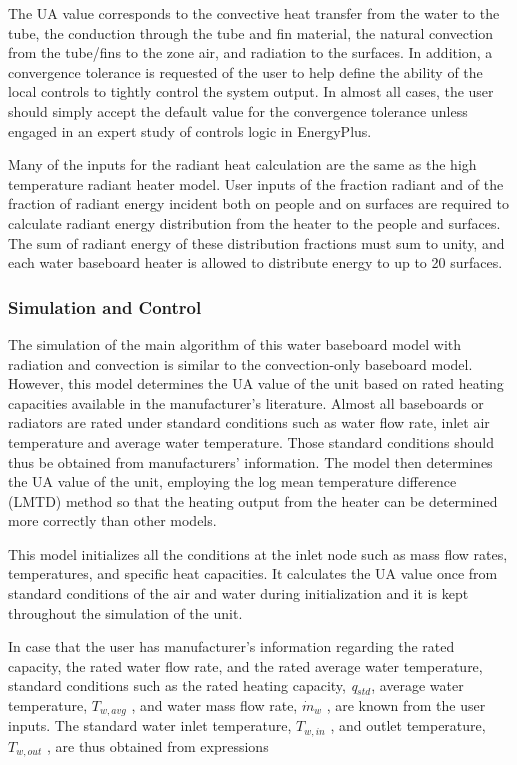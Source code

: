 The UA value corresponds to the convective heat transfer from the water to the tube, the conduction through the tube and fin material, the natural convection from the tube/fins to the zone air, and radiation to the surfaces. In addition, a convergence tolerance is requested of the user to help define the ability of the local controls to tightly control the system output. In almost all cases, the user should simply accept the default value for the convergence tolerance unless engaged in an expert study of controls logic in EnergyPlus.

Many of the inputs for the radiant heat calculation are the same as the high temperature radiant heater model. User inputs of the fraction radiant and of the fraction of radiant energy incident both on people and on surfaces are required to calculate radiant energy distribution from the heater to the people and surfaces. The sum of radiant energy of these distribution fractions must sum to unity, and each water baseboard heater is allowed to distribute energy to up to 20 surfaces.

\subsubsection{Simulation and Control}\label{simulation-and-control-2-000}

The simulation of the main algorithm of this water baseboard model with radiation and convection is similar to the convection-only baseboard model. However, this model determines the UA value of the unit based on rated heating capacities available in the manufacturer's literature. Almost all baseboards or radiators are rated under standard conditions such as water flow rate, inlet air temperature and average water temperature. Those standard conditions should thus be obtained from manufacturers' information. The model then determines the UA value of the unit, employing the log mean temperature difference (LMTD) method so that the heating output from the heater can be determined more correctly than other models.

This model initializes all the conditions at the inlet node such as mass flow rates, temperatures, and specific heat capacities. It calculates the UA value once from standard conditions of the air and water during initialization and it is kept throughout the simulation of the unit.

In case that the user has manufacturer's information regarding the rated capacity, the rated water flow rate, and the rated average water temperature, standard conditions such as the rated heating capacity, \emph{q\(_{std}\)}, average water temperature, \({T_{w,avg}}\) , and water mass flow rate, \(\dot m{}_w\) , are known from the user inputs. The standard water inlet temperature, \({T_{w,in}}\) , and outlet temperature, \({T_{w,out}}\) , are thus obtained from expressions

